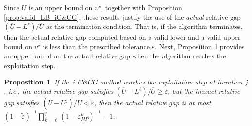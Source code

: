 \documentclass[preprint,review,11pt]{elsarticle}
\newtheorem{prop}[thm]{Proposition}
\theoremstyle{definition}
\theoremstyle{remark}
\newcommand{\epst}{\widetilde{\varepsilon}}
\newcommand{\Ubar}{\overline{U}}
\begin{document}
Since $\Ubar$ is an upper bound on $\upsilon^\star$, together with Proposition \ref{prop:valid_LB_iC&CG}, these results justify the use of the \textit{actual} relative gap $(\Ubar-L^\ell)/\Ubar$ as the termination condition.  That is, if the algorithm terminates, then the actual relative gap computed based on a valid lower and a valid upper bound on $\upsilon^\star$ is less than the prescribed tolerance $\varepsilon$.  Next, Proposition \ref{prop:terminate_MIP_gap_iC&CG} provides an upper bound on the actual relative gap when the algorithm reaches the exploitation step.

\begin{prop}  \label{prop:terminate_MIP_gap_iC&CG}
If the i-C\&CG method reaches the exploitation step at iteration $j$, i.e., the actual relative gap satisfies $(\Ubar-L^\ell)/\Ubar\geq \varepsilon$, but the inexact relative gap satisfies  $(\Ubar-U^j)/\Ubar<\epst$, then the actual relative gap is at most $(1-\epst)^{-1} \prod_{k=\ell}^j (1-\varepsilon_{MP}^k)^{-1}-1$.
\end{prop}
\end{document}
